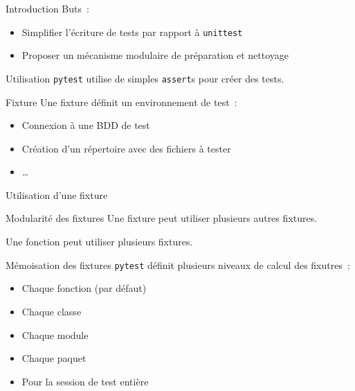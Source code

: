 \begin{frame}{Introduction}
  Buts~:
  \begin{itemize}[<+->]
    \item Simplifier l'écriture de tests par rapport à \texttt{unittest}
    \item Proposer un mécanisme modulaire de préparation et nettoyage
  \end{itemize}
\end{frame}

\begin{frame}{Utilisation}
  \texttt{pytest} utilise de simples \texttt{assert}s pour créer des tests.

\end{frame}

\begin{frame}{Fixture}
  Une fixture définit un environnement de test~:

  \begin{itemize}[<+->]
    \item Connexion à une BDD de test
    \item Création d'un répertoire avec des fichiers à tester
    \item …
  \end{itemize}
\end{frame}

\begin{frame}{Utilisation d'une fixture}
\end{frame}

\begin{frame}{Modularité des fixtures}
  Une fixture peut utiliser plusieurs autres fixtures.

  Une fonction peut utiliser plusieurs fixtures.
\end{frame}

\begin{frame}{Mémoisation des fixtures}
  \texttt{pytest} définit plusieurs niveaux de calcul des fixutres~:

  \begin{itemize}[<+->]
    \item Chaque fonction (par défaut)
    \item Chaque classe
    \item Chaque module
    \item Chaque paquet
    \item Pour la session de test entière
  \end{itemize}
\end{frame}

